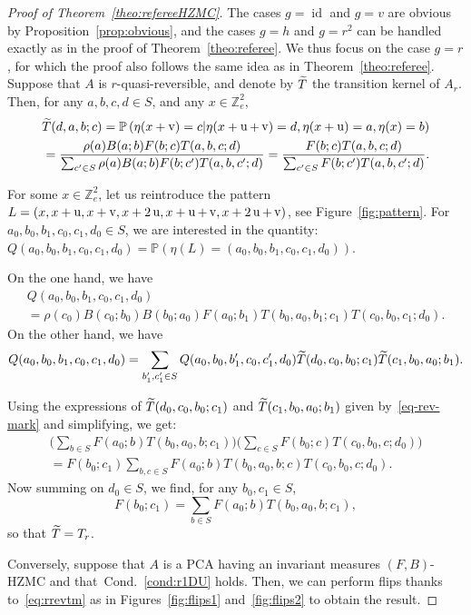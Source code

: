 \documentclass[10pt]{amsart}
\theoremstyle{definition}\newtheorem{defi}[theo]{Definition}\newtheorem{rema}[theo]{Remark}\newtheorem{exam}[theo]{Example}\newtheorem{exem}[theo]{Example}\newtheorem{nota}[theo]{Notation}
\let\oldtilde\tilde
\renewcommand*{\tilde}[1]{\mathchoice{\widetilde{#1}}{\widetilde{#1}}{\oldtilde{#1}}{\oldtilde{#1}}}
\newcounter{a}
\newcommand{\Cond}{Cond.}
\newcommand{\tT}{\tilde T}
\DeclareMathOperator{\id}{id}
\newcommand{\Z}{\mathbb{Z}}
\newcommand{\Pbb}{\mathbb{P}}
\DeclareMathOperator{\vu}{u}
\DeclareMathOperator{\vv}{v}
\begin{document}
\begin{proof}[Proof of Theorem~\ref{theo:refereeHZMC}] The cases $g=\id$ and $g=v$ are obvious by Proposition~\ref{prop:obvious}, and the cases $g=h$ and $g=r^2$ can be handled exactly as in the proof of Theorem~\ref{theo:referee}.
We thus focus on the case $g=r$, for which the proof also follows the same idea as in Theorem~\ref{theo:referee}.
Suppose that $A$ is $r$-quasi-reversible, and denote by $\tT$ the transition kernel of $A_r$. Then, for any $a,b,c,d\in S$, and any $x \in \Z_{e}^2$,
\begin{equation}\label{eq-rev-mark}
\begin{aligned}
\tT(d,a,b;c)= \Pbb\left(\eta(x+\vv)=c | \eta(x+\vu+\vv)=d,\eta(x+\vu)=a,\eta(x)=b\right)\\
= \frac{\rho(a) B(a;b) F(b;c) T(a,b,c;d)}{\sum_{c'\in S} \rho(a) B(a;b) F(b;c') T(a,b,c';d)} = \frac{F(b;c) T(a,b,c;d)}{\sum_{c'\in S} F(b;c') T(a,b,c';d)}.
\end{aligned}
\end{equation}

For some $x \in \Z_{e}^2$, let us reintroduce the pattern $L=(x,x+\vu,x+\vv, x+2\vu,\linebreak x+\vu+\vv,x+2\vu+\vv)$, see Figure~\ref{fig:pattern}. For $a_0,b_0,b_1,c_0,c_1,d_0 \in S$, we are interested in the quantity: $Q(a_0,b_0,b_1,c_0,c_1,d_0)=\Pbb\left(\eta(L)=(a_0,b_0,b_1,c_0,c_1,d_0)\right).$

On the one hand, we have
\begin{multline*}
Q(a_0,b_0,b_1,c_0,c_1,d_0)\\
=\rho(c_0) B(c_0;b_0) B(b_0;a_0) F(a_0;b_1) T(b_0,a_0,b_1;c_1) T(c_0,b_0,c_1;d_0).
\end{multline*}
On the other hand, we have
\[
Q(a_0,b_0,b_1,c_0,c_1,d_0)=\sum_{b'_1,c'_1\in S}Q(a_0,b_0,b'_1,c_0,c'_1,d_0)\tT(d_0,c_0,b_0;c_1)\tT(c_1,b_0,a_0;b_1).
\]

Using the expressions of $\tT(d_0,c_0,b_0;c_1)$ and $\tT(c_1,b_0,a_0;b_1)$ given by~\eqref{eq-rev-mark} and simplifying, we get:
\begin{multline*}
\bigg(\sum_{b\in S} F(a_0;b) T(b_0,a_0,b;c_1) \bigg) \bigg(\sum_{c\in S} F(b_0;c) T(c_0,b_0,c;d_0) \bigg)\\
= F(b_0;c_1) \sum_{b,c\in S} F(a_0;b) T(b_0,a_0,b;c) T(c_0,b_0,c;d_0).
\end{multline*}
Now summing on $d_0 \in S$, we find, for any $b_0,c_1\in S$,
\[
F(b_0;c_1) = \sum_{b\in S} F(a_0;b) T(b_0,a_0,b;c_1),
\]
so that $\tT=T_r$.

Conversely, suppose that $A$ is a PCA having an invariant measures $(F,B)$-HZMC and that~\Cond~\ref{cond:r1DU} holds. Then, we can perform flips thanks to~\eqref{eq:rrevtm} as in Figures~\ref{fig:flips1} and~\ref{fig:flips2} to obtain the result.
\end{proof}
\end{document}
